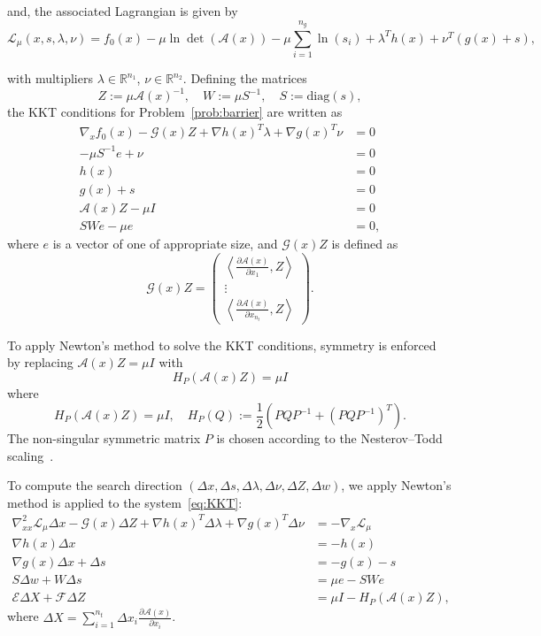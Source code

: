 \documentclass[]{interact}
\theoremstyle{plain}%
\theoremstyle{definition}
\theoremstyle{remark}
\begin{document}
and, the associated Lagrangian is given by
\begin{equation}\label{prob:lag}
\mathcal{L}_\mu(x, s, \lambda, \nu) = f_0(x) - \mu \ln\det(\mathcal{A}(x)) - \mu \sum_{i=1}^{n_g} \ln(s_i) + \lambda^T h(x) + \nu^T (g(x) + s),
\end{equation}

with multipliers \( \lambda \in \mathbb{R}^{n_1} \), \( \nu \in \mathbb{R}^{n_2} \). Defining the matrices
\[
Z := \mu \mathcal{A}(x)^{-1}, \quad W := \mu S^{-1}, \quad S := \mathrm{diag}(s),
\]
the KKT conditions for Problem~\eqref{prob:barrier} are written as
\begin{subequations}\label{eq:KKT}
\begin{align}
\nabla_x f_0(x) - \mathcal{G}(x) Z + \nabla h(x)^T \lambda + \nabla g(x)^T \nu &= 0 \\
-\mu S^{-1} e + \nu &= 0 \\
h(x) &= 0 \\
g(x) + s &= 0 \\
\mathcal{A}(x) Z - \mu I &= 0 \\
SWe - \mu e &= 0,
\end{align}
\end{subequations}
where $e$ is a vector of one of appropriate size, and \( \mathcal{G}(x)Z \) is defined as
\[
\mathcal{G}(x)Z = 
\begin{pmatrix}
\left\langle \frac{\partial \mathcal{A}(x)}{\partial x_1}, Z \right\rangle \\
\vdots \\
\left\langle \frac{\partial \mathcal{A}(x)}{\partial x_{n_t}}, Z \right\rangle
\end{pmatrix}.
\]

To apply Newton's method to solve the KKT conditions,  symmetry is enforced by replacing \( \mathcal{A}(x)Z = \mu I \) with
\[
H_P(\mathcal{A}(x)Z) = \mu I
\]
where 
\[
H_P(\mathcal{A}(x)Z) = \mu I, \quad H_P(Q) := \frac{1}{2}(PQP^{-1} + (PQP^{-1})^T).
\]
The non-singular symmetric matrix \( P \) is chosen according to the Nesterov–Todd scaling~\cite{NT_1997,NT_1998}.

To compute the search direction \( (\Delta x, \Delta s, \Delta \lambda, \Delta \nu, \Delta Z, \Delta w) \), we apply Newton's method is applied to the system~\eqref{eq:KKT}:
\begin{equation}\label{eq:Newton}
\begin{aligned}
\nabla^2_{xx} \mathcal{L}_\mu \Delta x - \mathcal{G}(x) \Delta Z + \nabla h(x)^T \Delta \lambda + \nabla g(x)^T \Delta \nu &= -\nabla_x \mathcal{L}_\mu \\
\nabla h(x) \Delta x &= -h(x) \\
\nabla g(x) \Delta x + \Delta s &= -g(x) - s \\
S \Delta w + W \Delta s &= \mu e - S We \\
\mathcal{E} \Delta X + \mathcal{F} \Delta Z &= \mu I - H_P(\mathcal{A}(x)Z),
\end{aligned}
\end{equation}
where \( \Delta X = \sum_{i=1}^{n_t} \Delta x_i \frac{\partial \mathcal{A}(x)}{\partial x_i} \).
\end{document}
